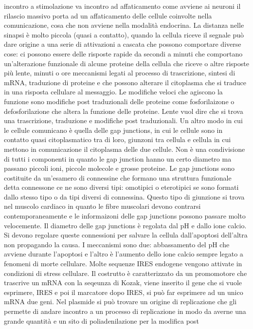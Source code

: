 incontro a stimolazione va incontro ad affaticamento come avviene ai neuroni il rilascio massivo porta ad un affaticamento delle cellule coinvolte nella comunicazione, cosa che non
avviene nella modalit\`a endocrina. La distanza nelle sinapsi \`e molto piccola (quasi a contatto), quando la cellula riceve il segnale pu\`o dare origine a una serie di attivazioni a
cascata che possono comportare diverse cose: ci possono essere delle risposte rapide da secondi a minuti che comportano un'alterazione funzionale di alcune proteine della cellula che
riceve o altre risposte pi\`u lente, minuti o ore meccanismi legati al processo di trascrizione, sintesi di mRNA, traduzione di proteine e che possono alterare il citoplasma che si
traduce in una risposta cellulare al messaggio. Le modifiche veloci che agiscono la funzione sono modifiche post traduzionali delle proteine come fosforilaizone o defosforilazione che
altera la funzione delle proteine. Lente vuol dire che si trova una trascrizione, traduzione e modifiche post traduzionali. Un altro modo in cui le cellule comunicano \`e quella delle
gap junctions, in cui le cellule sono in contatto quasi citoplasmatico tra di loro, giunzoni tra cellula e cellula in cui mettono in comunicazione il citoplasma delle due cellule. Non
\`e una condivisione di tutti i componenti in quanto le gap junction hanno un certo diametro ma passano piccoli ioni, piccole molecole e grosse proteine. Le gap junctions sono 
costituite da un'esamero di connessine che formano una struttura funzionale detta connessone ce ne sono diversi tipi: omotipici o eterotipici se sono formati dallo stesso tipo o da tipi
diversi di connessina. Questo tipo di giunzione si trova nel muscolo cardiaco in quanto le fibre muscolari devono contrarsi contemporaneamente e le informaizoni delle gap junctions 
possono passare molto velocemente. Il diametro delle gap junctions \`e regolata dal pH e dallo ione calcio. Si devono regolare queste connessioni per salvare la cellula dall'apoptosi 
dell'altra non propagando la causa. I meccanismi sono due: abbassamento del pH che avviene durante l'apoptosi e l'altro \`e l'aumento dello ione calcio sempre legato a fenomeni di morte
cellulare. Molte sequenze IRES endogene vengono attivate in condizioni di stress cellulare. Il costrutto \`e caratterizzato da un promomotore che trascrive un mRNA con la seqeunza
di Kozak, viene inserito il gene che si vuole esprimere, IRES e poi il marcatore dopo IRES, si pu\`o far esprimere ad un unico mRNA due geni. Nel plasmide si pu\`o trovare un origine
di replicazione che gli permette di andare incontro a un processo di replicazione in modo da averne una grande quantit\`a e un sito di poliadenilazione per la modifica post 
